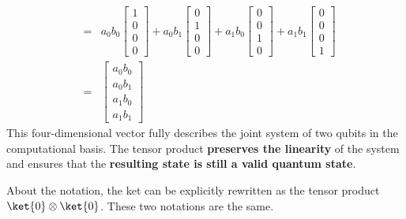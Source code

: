 \begin{equation}
\begin{array}{rcl}
                                        &=& a_{0}b_{0} \begin{bmatrix} 1 \\ 0 \\ 0 \\ 0 \end{bmatrix}
                                            +
                                            a_{0}b_{1} \begin{bmatrix} 0 \\ 1 \\ 0 \\ 0 \end{bmatrix}
                                            +
                                            a_{1}b_{0} \begin{bmatrix} 0 \\ 0 \\ 1 \\ 0 \end{bmatrix}
                                            +
                                            a_{1}b_{1} \begin{bmatrix} 0 \\ 0 \\ 0 \\ 1 \end{bmatrix}                                           \\ [2.5em]
                                        &=& \begin{bmatrix} a_{0} b_{0} \\ a_{0} b_{1} \\ a_{1} b_{0} \\ a_{1} b_{1} \end{bmatrix}
    \end{array}
\end{equation}
This four-dimensional vector fully describes the joint system of two qubits in the computational basis. The tensor product \textbf{preserves the linearity} of the system and ensures that the \textbf{resulting state is still a valid quantum state}.

\highspace
About the notation, the ket  can be explicitly rewritten as the tensor product $\ket{0} \otimes \ket{0}$. These two notations are the same.

